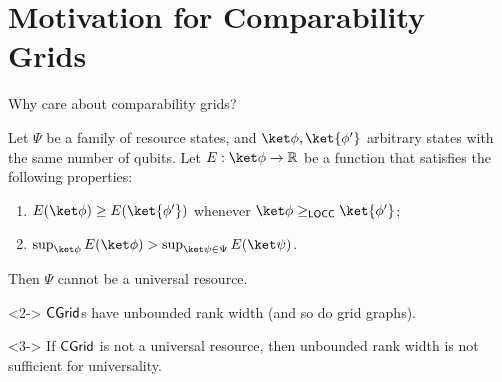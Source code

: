 \section{Motivation for Comparability Grids}

\begin{frame}{Why care about comparability grids?}

\begin{theorem}
Let $\Psi$ be a family of resource states, and $\ket\phi, \ket{\phi'}$ arbitrary states with the same number of qubits. Let $E: \ket\phi \to \mathbb{R}$ be a function that satisfies the following properties:
\begin{enumerate}
    \item $E(\ket\phi) \geq E(\ket{\phi'})$ whenever $\ket\phi \geq_{\LOCC} \ket{\phi'}$;
    \item $\sup_{\ket\phi} E(\ket\phi) > \sup_{\ket\psi \in \Psi} E(\ket\psi)$. 
\end{enumerate}
Then $\Psi$ cannot be a universal resource.
\end{theorem}

\begin{theorem}<2->
$\textsf{CGrid}$s have unbounded rank width (and so do grid graphs).
\end{theorem}

\begin{corollary}<3->   
If $\textsf{CGrid}$ is not a universal resource, then unbounded rank width is not sufficient for universality.
\end{corollary}

\end{frame}